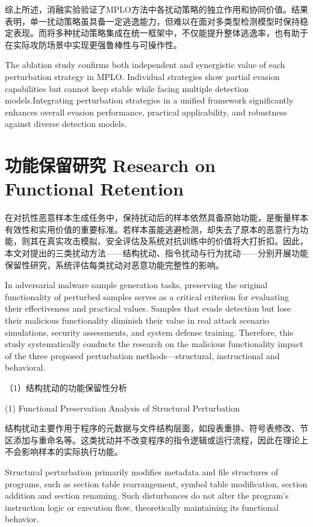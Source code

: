 综上所述，消融实验验证了MPLO方法中各扰动策略的独立作用和协同价值。结果表明，单一扰动策略虽具备一定逃逸能力，但难以在面对多类型检测模型时保持稳定表现。而将多种扰动策略集成在统一框架中，不仅能提升整体逃逸率，也有助于在实际攻防场景中实现更强鲁棒性与可操作性。

The ablation study confirms both independent and synergistic value of each perturbation strategy in MPLO. Individual strategies show partial evasion capabilities but cannot keep stable while facing multiple detection models.Integrating perturbation strategies in a unified framework significantly enhances overall evasion performance, practical applicability, and robustness against diverse detection models.  

\section{功能保留研究 Research on Functional Retention}

在对抗性恶意样本生成任务中，保持扰动后的样本依然具备原始功能，是衡量样本有效性和实用价值的重要标准。若样本虽能逃避检测，却失去了原本的恶意行为功能，则其在真实攻击模拟、安全评估及系统对抗训练中的价值将大打折扣。因此，本文对提出的三类扰动方法——结构扰动、指令扰动与行为扰动——分别开展功能保留性研究，系统评估每类扰动对恶意功能完整性的影响。

In adversarial malware sample generation tasks, preserving the original functionality of perturbed samples serves as a critical criterion for evaluating their effectiveness and practical values. Samples that evade detection but lose their malicious functionality diminish their value in real attack scenario simulations, security assessments, and system defense training. Therefore, this study systematically conducts the research on the malicious functionality impact of the three proposed perturbation methods—structural, instructional and behavioral.

（1）结构扰动的功能保留性分析

(1) Functional Preservation Analysis of Structural Perturbation

结构扰动主要作用于程序的元数据与文件结构层面，如段表重排、符号表修改、节区添加与重命名等。这类扰动并不改变程序的指令逻辑或运行流程，因此在理论上不会影响样本的实际执行功能。

Structural perturbation primarily modifies metadata and file structures of programs, such as section table rearrangement, symbol table modification, section addition and section renaming. Such disturbances do not alter the program's instruction logic or execution flow, theoretically maintaining its functional behavior.

